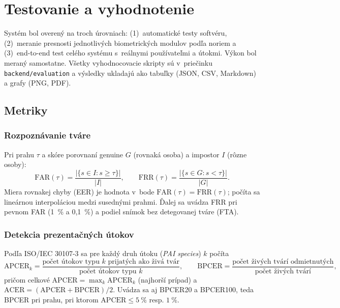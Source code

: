 \chapter{Testovanie a vyhodnotenie}
\label{ch:testovanie}

Systém bol overený na troch úrovniach: (1)~automatické testy softvéru, (2)~meranie
presnosti jednotlivých biometrických modulov podľa noriem a (3)~end-to-end test celého
systému s~reálnymi používateľmi a útokmi. Výkon bol meraný samostatne. Všetky
vyhodnocovacie skripty sú v~priečinku \texttt{backend/evaluation} a výsledky ukladajú
ako tabuľky (JSON, CSV, Markdown) a grafy (PNG, PDF).

\section{Metriky}

\subsection*{Rozpoznávanie tváre}
Pri prahu $\tau$ a skóre porovnaní genuine $G$ (rovnaká osoba) a impostor $I$ (rôzne
osoby):
\begin{equation}
  \mathrm{FAR}(\tau) = \frac{|\{s \in I : s \ge \tau\}|}{|I|},
  \qquad
  \mathrm{FRR}(\tau) = \frac{|\{s \in G : s < \tau\}|}{|G|}.
\end{equation}
Miera rovnakej chyby (EER) je hodnota v~bode $\mathrm{FAR}(\tau) = \mathrm{FRR}(\tau)$;
počíta sa lineárnou interpoláciou medzi susednými prahmi. Ďalej sa uvádza FRR pri
pevnom FAR (1~\% a 0,1~\%) a podiel snímok bez detegovanej tváre (FTA).

\subsection*{Detekcia prezentačných útokov}
Podľa ISO/IEC 30107-3 \cite{iso30107-3, busch2023standards} sa pre každý druh útoku
(\emph{PAI species}) $k$ počíta
\begin{equation}
  \mathrm{APCER}_k = \frac{\text{počet útokov typu } k \text{ prijatých ako živá tvár}}{\text{počet útokov typu } k},
  \qquad
  \mathrm{BPCER} = \frac{\text{počet živých tvárí odmietnutých}}{\text{počet živých tvárí}},
\end{equation}
pričom celkové $\mathrm{APCER} = \max_k \mathrm{APCER}_k$ (najhorší prípad) a
$\mathrm{ACER} = (\mathrm{APCER} + \mathrm{BPCER})/2$. Uvádza sa aj BPCER20 a BPCER100,
teda BPCER pri prahu, pri ktorom $\mathrm{APCER} \le 5~\%$ resp. $1~\%$.


